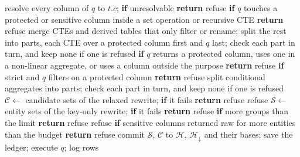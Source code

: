\documentclass[sigconf,nonacm]{acmart}
\begin{document}
\begin{algorithm}[!t]
\caption{Gateway check for query $q$ under a purpose}\label{alg:gateway}
\begin{algorithmic}[1]
\State resolve every column of $q$ to $t.c$; \textbf{if} unresolvable \textbf{return} refuse
\State \textbf{if} $q$ touches a protected or sensitive column inside a set operation or recursive CTE \textbf{return} refuse
\State merge CTEs and derived tables that only filter or rename; split the rest into parts, each CTE over a protected column first and $q$ last; check each part in turn, and keep none if one is refused 
\State \textbf{if} $q$ returns a protected column, uses one in a non-linear aggregate, or uses a column outside the purpose \textbf{return} refuse 
\State \textbf{if} strict and $q$ filters on a protected column \textbf{return} refuse
\State split conditional aggregates into parts; check each part in turn, and keep none if one is refused
  \State $\mathcal{C}\gets$ candidate sets of the relaxed rewrite; \textbf{if} it fails \textbf{return} refuse
   \Return refuse  \EndIf
\EndFor
{}
  \State $\mathcal{S}\gets$ entity sets of the key-only rewrite; \textbf{if} it fails \textbf{return} refuse
  \State \textbf{if} more groups than the limit \textbf{return} refuse
   \Return refuse  \EndIf
\EndFor
\State \textbf{if} sensitive columns returned raw for more entities than the budget \textbf{return} refuse
\State commit $\mathcal{S}$, $\mathcal{C}$ to $\mathcal{H}$, $\mathcal{H}_{\downarrow}$ and their bases; save the ledger; execute $q$; log
\State \Return rows
\end{algorithmic}
\end{algorithm}
\end{document}
